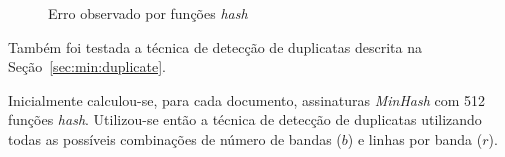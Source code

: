 \begin{figure}[!htbp]
{}
\caption{Erro observado por funções \emph{hash}}
\label{fig:min:result}
\end{figure}

Também foi testada a técnica de detecção de duplicatas descrita na Seção~\ref{sec:min:duplicate}. 

Inicialmente calculou-se, para cada documento, assinaturas \emph{MinHash} com 512 funções \emph{hash}. Utilizou-se então a técnica de detecção de duplicatas utilizando todas as possíveis combinações de número de bandas ($b$) e linhas por banda ($r$). 

